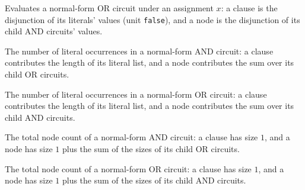 \begin{definition}
\label{BoolCircuit.NOrCircuit.eval}
\leanok
{}
Evaluates a normal-form OR circuit under an assignment $x$: a clause is the disjunction
of its literals' values (unit \texttt{false}), and a node is the disjunction of its child
AND circuits' values.
\end{definition}

\begin{definition}
\label{BoolCircuit.NAndCircuit.litCount}
\leanok
{}
The number of literal occurrences in a normal-form AND circuit: a clause contributes the
length of its literal list, and a node contributes the sum over its child OR circuits.
\end{definition}

\begin{definition}
\label{BoolCircuit.NOrCircuit.litCount}
\leanok
{}
The number of literal occurrences in a normal-form OR circuit: a clause contributes the
length of its literal list, and a node contributes the sum over its child AND circuits.
\end{definition}

\begin{definition}
\label{BoolCircuit.NAndCircuit.size}
\leanok
{}
The total node count of a normal-form AND circuit: a clause has size $1$, and a node has
size $1$ plus the sum of the sizes of its child OR circuits.
\end{definition}

\begin{definition}
\label{BoolCircuit.NOrCircuit.size}
\leanok
{}
The total node count of a normal-form OR circuit: a clause has size $1$, and a node has
size $1$ plus the sum of the sizes of its child AND circuits.
\end{definition}

